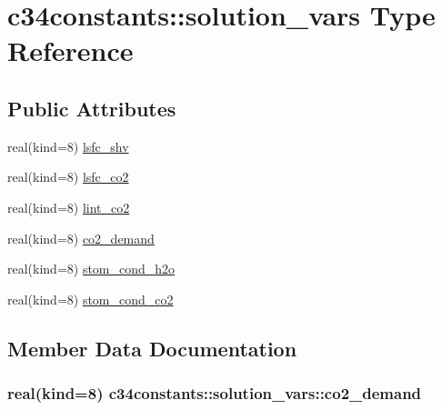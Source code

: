 \hypertarget{structc34constants_1_1solution__vars}{}\section{c34constants\+:\+:solution\+\_\+vars Type Reference}
\label{structc34constants_1_1solution__vars}
\subsection*{Public Attributes}
\begin{DoxyCompactItemize}
\item 
real(kind=8) \hyperlink{structc34constants_1_1solution__vars_a0df579a15ba37cb260c02e5e5006a898}{lsfc\+\_\+shv}
\item 
real(kind=8) \hyperlink{structc34constants_1_1solution__vars_ac883ed09e84e928780493e4964a66a7c}{lsfc\+\_\+co2}
\item 
real(kind=8) \hyperlink{structc34constants_1_1solution__vars_a02f4a98ac3084ca6df1289a9c5d98b5f}{lint\+\_\+co2}
\item 
real(kind=8) \hyperlink{structc34constants_1_1solution__vars_a76ff465202bc6670a65318d765d34a29}{co2\+\_\+demand}
\item 
real(kind=8) \hyperlink{structc34constants_1_1solution__vars_af8670de0f15d89016b814037183ece8e}{stom\+\_\+cond\+\_\+h2o}
\item 
real(kind=8) \hyperlink{structc34constants_1_1solution__vars_a0ff64b64e4fcc1416cb87b47a096d7a1}{stom\+\_\+cond\+\_\+co2}
\end{DoxyCompactItemize}


\subsection{Member Data Documentation}
\subsubsection[{\texorpdfstring{co2\+\_\+demand}{co2_demand}}]{\setlength{\rightskip}{0pt plus 5cm}real(kind=8) c34constants\+::solution\+\_\+vars\+::co2\+\_\+demand}\hypertarget{structc34constants_1_1solution__vars_a76ff465202bc6670a65318d765d34a29}{}\label{structc34constants_1_1solution__vars_a76ff465202bc6670a65318d765d34a29}
